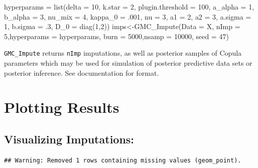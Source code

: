 \documentclass[
]{article}
\newenvironment{Shaded}{\begin{snugshade}}{\end{snugshade}}
\newcommand{\AttributeTok}[1]{\textcolor[rgb]{0.77,0.63,0.00}{#1}}
\newcommand{\DecValTok}[1]{\textcolor[rgb]{0.00,0.00,0.81}{#1}}
\newcommand{\FunctionTok}[1]{\textcolor[rgb]{0.00,0.00,0.00}{#1}}
\newcommand{\NormalTok}[1]{#1}
\newcommand{\OtherTok}[1]{\textcolor[rgb]{0.56,0.35,0.01}{#1}}
\begin{document}
\begin{Shaded}
\begin{Highlighting}[]
\NormalTok{hyperparams }\OtherTok{=} \FunctionTok{list}\NormalTok{(}\AttributeTok{delta =} \DecValTok{10}\NormalTok{,}
                   \AttributeTok{k.star =} \DecValTok{2}\NormalTok{,}
                   \AttributeTok{plugin.threshold =} \DecValTok{100}\NormalTok{,}
                   \AttributeTok{a\_alpha =} \DecValTok{1}\NormalTok{,}
                   \AttributeTok{b\_alpha =} \DecValTok{3}\NormalTok{,}
                   \AttributeTok{nu\_mix =} \DecValTok{4}\NormalTok{,}
                   \AttributeTok{kappa\_0 =}\NormalTok{ .}\DecValTok{001}\NormalTok{,}
                   \AttributeTok{nu =} \DecValTok{3}\NormalTok{,}
                   \AttributeTok{a1 =} \DecValTok{2}\NormalTok{,}
                   \AttributeTok{a2 =} \DecValTok{3}\NormalTok{,}
                   \AttributeTok{a.sigma =} \DecValTok{1}\NormalTok{,}
                   \AttributeTok{b.sigma =}\NormalTok{ .}\DecValTok{3}\NormalTok{,}
                   \AttributeTok{D\_0 =} \FunctionTok{diag}\NormalTok{(}\DecValTok{1}\NormalTok{,}\DecValTok{2}\NormalTok{))}
\NormalTok{imps}\OtherTok{\textless{}{-}}\FunctionTok{GMC\_Impute}\NormalTok{(}\AttributeTok{Data =}\NormalTok{ X, }\AttributeTok{nImp =} \DecValTok{5}\NormalTok{,}\AttributeTok{hyperparams =}\NormalTok{ hyperparams, }\AttributeTok{burn =} \DecValTok{5000}\NormalTok{,}\AttributeTok{nsamp =} \DecValTok{10000}\NormalTok{, }\AttributeTok{seed =} \DecValTok{47}\NormalTok{)}
\end{Highlighting}
\end{Shaded}

\texttt{GMC\_Impute} returns \texttt{nImp} imputations, as well as
posterior samples of Copula parameters which may be used for simulation
of posterior predictive data sets or posterior inference. See
documentation for format.

\hypertarget{plotting-results}{%
\section{Plotting Results}\label{plotting-results}}

\hypertarget{visualizing-imputations}{%
\subsection{Visualizing Imputations:}\label{visualizing-imputations}}

\begin{verbatim}
## Warning: Removed 1 rows containing missing values (geom_point).
\end{verbatim}
\end{document}

